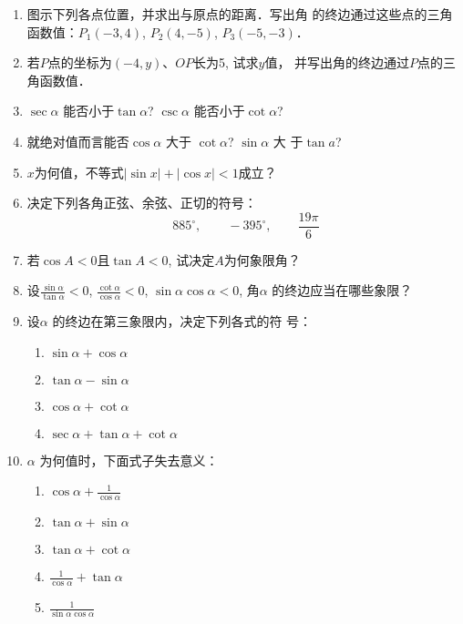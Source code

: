 \begin{ex}
\begin{enumerate}
    \item 图示下列各点位置，并求出与原点的距离．写出角
的终边通过这些点的三角函数值：$P_1(-3,4)$, $P_2(4,-5)$,
$P_3(-5,-3)$．
\item 若$P$点的坐标为$(-4,y)$、$OP$长为5, 试求$y$值，
并写出角的终边通过$P$点的三角函数值．
\item $\sec\alpha$ 能否小于$\tan \alpha$? $\csc\alpha$ 能否小于$\cot\alpha$?
\item 就绝对值而言能否$\cos\alpha$  大于 
$\cot\alpha$? $\sin\alpha$ 大
于$\tan a$?
\item $x$为何值，不等式$|\sin x|+|\cos x|<1$成立？
\item 决定下列各角正弦、余弦、正切的符号：
\[885^{\circ},\qquad -395^{\circ},\qquad \frac{19\pi}{6}\]
\item 若$\cos A<0$且$\tan A<0$, 试决定$A$为何象限角？
\item 设$\frac{\sin\alpha}{\tan\alpha}<0$, $\frac{\cot\alpha}{\cos\alpha}<0$, $\sin\alpha \cos\alpha <0$, 角$\alpha$ 的终边应当在哪些象限？
\item 设$\alpha$ 的终边在第三象限内，决定下列各式的符
号：
\begin{multicols}{2}
\begin{enumerate}
    \item $\sin\alpha  +\cos\alpha$
    \item $\tan \alpha-\sin\alpha$
    \item $\cos\alpha +\cot \alpha$
    \item $\sec\alpha  +\tan \alpha  +\cot \alpha$
\end{enumerate}    
\end{multicols}

\item $\alpha$ 为何值时，下面式子失去意义：
\begin{multicols}{2}
\begin{enumerate}
    \item $\cos\alpha  +\frac{1}{\cos\alpha}$
    \item $\tan \alpha+\sin\alpha$
    \item  $\tan \alpha+\cot\alpha$
    \item $\frac{1}{\cos\alpha} +\tan \alpha$
    \item $\frac{1}{\sin\alpha\cos\alpha}$
\end{enumerate}    
\end{multicols}
\end{enumerate}
\end{ex}

